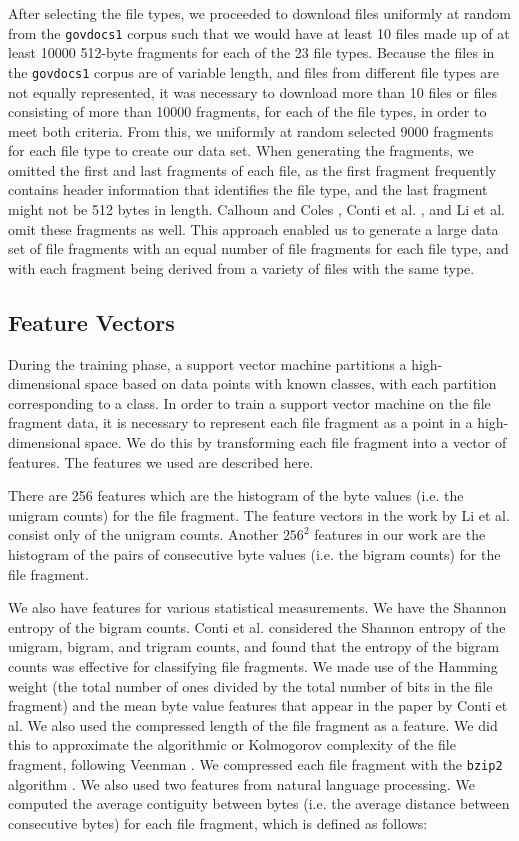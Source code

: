 \documentclass[letter,11pt]{article}
\begin{document}
After selecting the file types, we proceeded to download files uniformly at random from the \texttt{govdocs1} corpus such that we would have at least 10 files made up of at least 10000 512-byte fragments for each of the 23 file types. Because the files in the \texttt{govdocs1} corpus are of variable length, and files from different file types are not equally represented, it was necessary to download more than 10 files or files consisting of more than 10000 fragments, for each of the file types, in order to meet both criteria. From this, we uniformly at random selected 9000 fragments for each file type to create our data set. When generating the fragments, we omitted the first and last fragments of each file, as the first fragment frequently contains header information that identifies the file type, and the last fragment might not be 512 bytes in length. Calhoun and Coles \cite{Calhoun08}, Conti et al. \cite{Conti10}, and Li et al. \cite{Li10} omit these fragments as well. This approach enabled us to generate a large data set of file fragments with an equal number of file fragments for each file type, and with each fragment being derived from a variety of files with the same type.

\subsection{Feature Vectors}
\label{Subsection:FeatureVectors}
During the training phase, a support vector machine partitions a high-dimensional space based on data points with known classes, with each partition corresponding to a class. In order to train a support vector machine on the file fragment data, it is necessary to represent each file fragment as a point in a high-dimensional space. We do this by transforming each file fragment into a vector of features. The features we used are described here.

There are 256 features which are the histogram of the byte values (i.e. the unigram counts) for the file fragment. The feature vectors in the work by Li et al. \cite{Li10} consist only of the unigram counts. Another $256^2$ features in our work are the histogram of the pairs of consecutive byte values (i.e. the bigram counts) for the file fragment.

We also have features for various statistical measurements. We have the Shannon entropy \cite{Shannon48} of the bigram counts. Conti et al. \cite{Conti10} considered the Shannon entropy of the unigram, bigram, and trigram counts, and found that the entropy of the bigram counts was effective for classifying file fragments. We made use of the Hamming weight (the total number of ones divided by the total number of bits in the file fragment) and the mean byte value features that appear in the paper by Conti et al. We also used the compressed length of the file fragment as a feature. We did this to approximate the algorithmic or Kolmogorov complexity of the file fragment, following Veenman \cite{Veenman07}. We compressed each file fragment with the \texttt{bzip2} algorithm \cite{Seward01}. We also used two features from natural language processing. We computed the average contiguity between bytes (i.e. the average distance between consecutive bytes) for each file fragment, which is defined as follows:
\end{document}
